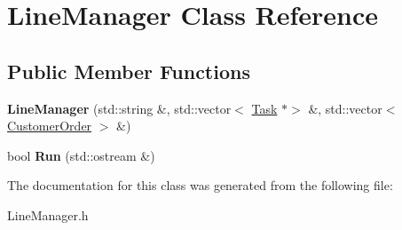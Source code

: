 \hypertarget{class_line_manager}{}\section{Line\+Manager Class Reference}
\label{class_line_manager}
\subsection*{Public Member Functions}
\begin{DoxyCompactItemize}
\item 
\mbox{\label{class_line_manager_a2927d6e91aa3bba5151c3043598a0737}} 
{\bfseries Line\+Manager} (std\+::string \&, std\+::vector$<$ \mbox{\hyperlink{class_task}{Task}} $\ast$$>$ \&, std\+::vector$<$ \mbox{\hyperlink{class_customer_order}{Customer\+Order}} $>$ \&)
\item 
\mbox{\label{class_line_manager_ad18c4a41e40fbfb89b6b218dfefa31ed}} 
bool {\bfseries Run} (std\+::ostream \&)
\end{DoxyCompactItemize}


The documentation for this class was generated from the following file\+:\begin{DoxyCompactItemize}
\item 
Line\+Manager.\+h\end{DoxyCompactItemize}
